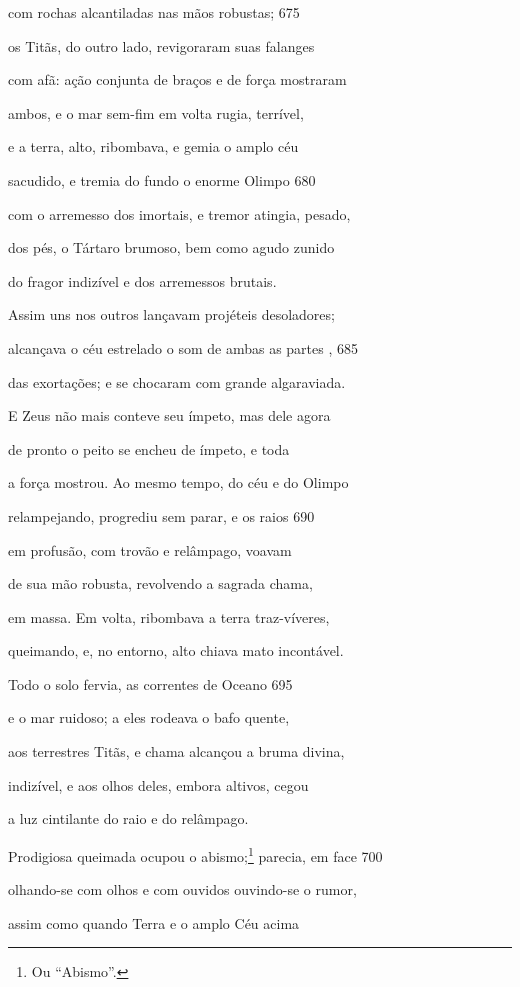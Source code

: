 com rochas alcantiladas nas mãos robustas; \num{675}

os Titãs, do outro lado, revigoraram suas falanges

com afã: ação conjunta de braços e de força mostraram

ambos, e o mar sem-fim em volta rugia, terrível,

e a terra, alto, ribombava, e gemia o amplo céu

sacudido, e tremia do fundo o enorme Olimpo \num{680}

com o arremesso dos imortais, e tremor atingia, pesado,

dos pés, o Tártaro brumoso, bem como agudo zunido

do fragor indizível e dos arremessos brutais.

Assim uns nos outros lançavam projéteis desoladores;

alcançava o céu estrelado o som de ambas as partes , \num{685}

das exortações; e se chocaram com grande algaraviada.

\quad{}E Zeus não mais conteve seu ímpeto, mas dele agora

de pronto o peito se encheu de ímpeto, e toda

a força mostrou. Ao mesmo tempo, do céu e do Olimpo

relampejando, progrediu sem parar, e os raios \num{690}

em profusão, com trovão e relâmpago, voavam

de sua mão robusta, revolvendo a sagrada chama,

em massa. Em volta, ribombava a terra traz-víveres,

queimando, e, no entorno, alto chiava mato incontável.

Todo o solo fervia, as correntes de Oceano \num{695}

e o mar ruidoso; a eles rodeava o bafo quente,

aos terrestres Titãs, e chama alcançou a bruma divina,

indizível, e aos olhos deles, embora altivos, cegou

a luz cintilante do raio e do relâmpago.

Prodigiosa queimada ocupou o abismo;\footnote{Ou ``Abismo''.} parecia, em face \num{700}

olhando-se com olhos e com ouvidos ouvindo-se o rumor,

assim como quando Terra e o amplo Céu acima

